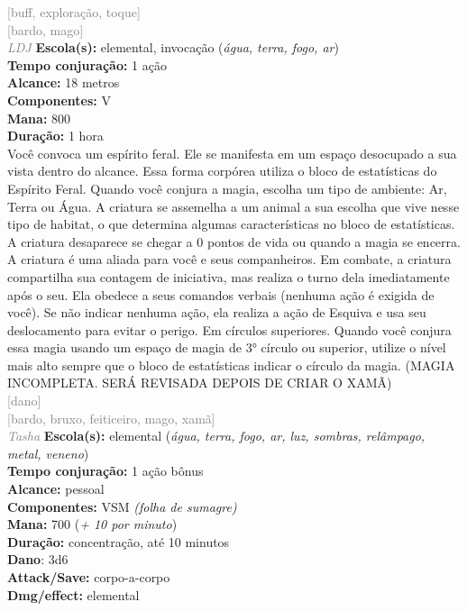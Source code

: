 \documentclass{RPG_Adventure}[2021/10/20]
\begin{document}
{\scriptsize \textcolor{gray}{[buff, exploração, toque]\\}}
{\scriptsize \textcolor{gray}{[bardo, mago]\\}}
{\tiny \textcolor{gray}{\textit{LDJ}}}
{\small \t \textbf{Escola(s):} elemental, invocação (\textit{água, terra, fogo, ar})\\\t \textbf{Tempo conjuração:} 1 ação\\\t \textbf{Alcance:} 18 metros\\\t \textbf{Componentes:} V\\\t \textbf{Mana:} 800\\\t \textbf{Duração:} 1 hora\\}
{\normalsize Você convoca um espírito feral. Ele se manifesta em um espaço desocupado a sua vista dentro do alcance. Essa forma corpórea utiliza o bloco de estatísticas do Espírito Feral. Quando você conjura a magia, escolha um tipo de ambiente: Ar, Terra ou Água. A criatura se assemelha a um animal a sua escolha que vive nesse tipo de habitat, o que determina algumas características no bloco de estatísticas.  A criatura desaparece se chegar a 0 pontos de vida ou quando a magia se encerra. A criatura é uma aliada para você e seus companheiros.  Em combate, a criatura compartilha sua contagem de iniciativa, mas realiza o turno dela imediatamente após o seu. Ela obedece a seus comandos verbais (nenhuma ação é exigida de você). Se não indicar nenhuma ação, ela realiza a ação de Esquiva e usa seu deslocamento para evitar o perigo.  Em círculos superiores. Quando você conjura essa magia usando um espaço de magia de 3° círculo ou superior, utilize o nível mais alto sempre que o bloco de estatísticas indicar o círculo da magia. (MAGIA INCOMPLETA. SERÁ REVISADA DEPOIS DE CRIAR O XAMÃ)\\}
{\scriptsize \textcolor{gray}{[dano]\\}}
{\scriptsize \textcolor{gray}{[bardo, bruxo, feiticeiro, mago, xamã]\\}}
{\tiny \textcolor{gray}{\textit{Tasha}}}
{\small \t \textbf{Escola(s):} elemental (\textit{água, terra, fogo, ar, luz, sombras, relâmpago, metal, veneno})\\\t \textbf{Tempo conjuração:} 1 ação bônus\\\t \textbf{Alcance:} pessoal\\\t \textbf{Componentes:} VSM \textit{(folha de sumagre)}\\\t \textbf{Mana:} 700 (\textit{+ 10 por minuto})\\\t \textbf{Duração:} concentração, até 10 minutos\\\t \textbf{Dano}: 3d6\\\t \textbf{Attack/Save:} corpo-a-corpo\\\t \textbf{Dmg/effect:} elemental\\}
\end{document}
